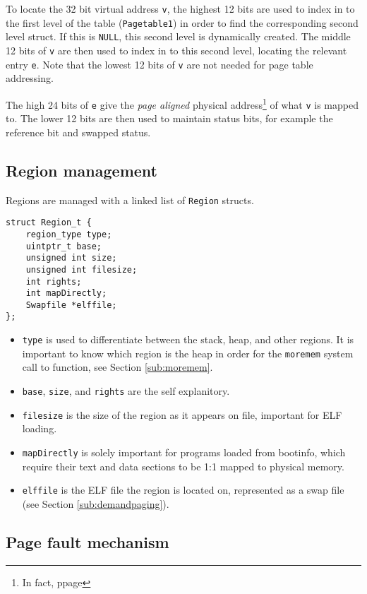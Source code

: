 \documentclass[12pt,english]{article}
\begin{document}
To locate the 32 bit virtual address \texttt{v}, the highest 12 bits are used to index in to the first level of the table (\texttt{Pagetable1}) in order to find the corresponding second level struct.  If this is \texttt{NULL}, this second level is dynamically created.  The middle 12 bits of \texttt{v} are then used to index in to this second level, locating the relevant entry \texttt{e}.  Note that the lowest 12 bits of \texttt{v} are not needed for page table addressing.

The high 24 bits of \texttt{e} give the \emph{page aligned} physical address\footnote{In fact, ppage} of what \texttt{v} is mapped to.  The lower 12 bits are then used to maintain status bits, for example the reference bit and swapped status.

\subsection{Region management}

Regions are managed with a linked list of \texttt{Region} structs.

\begin{verbatim}
struct Region_t {
	region_type type;
	uintptr_t base;
	unsigned int size;
	unsigned int filesize;
	int rights;
	int mapDirectly;
	Swapfile *elffile;
};
\end{verbatim}

\begin{itemize}
\item \texttt{type} is used to differentiate between the stack, heap, and other regions.  It is important to know which region is the heap in order for the \texttt{moremem} system call to function, see Section \ref{sub:moremem}.
\item \texttt{base}, \texttt{size}, and \texttt{rights} are the self explanitory.
\item \texttt{filesize} is the size of the region as it appears on file, important for ELF loading.
\item \texttt{mapDirectly} is solely important for programs loaded from bootinfo, which require their text and data sections to be 1:1 mapped to physical memory.
\item \texttt{elffile} is the ELF file the region is located on, represented as a swap file (see Section \ref{sub:demandpaging}).
\end{itemize}

\subsection{Page fault mechanism}
\end{document}
